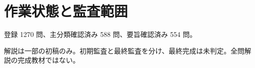 \chapter{作業状態と監査範囲}
登録 1270 問、主分類確認済み 588 問、要旨確認済み 554 問。
\par 解説は一部の初稿のみ。初期監査と最終監査を分け、最終完成は未判定。全問解説の完成教材ではない。

